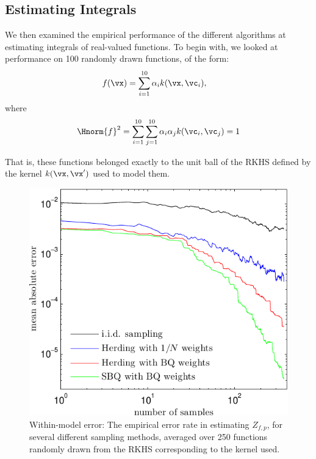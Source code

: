\subsection{Estimating Integrals}

We then examined the empirical performance of the different algorithms at estimating integrals of real-valued functions. To begin with, we looked at performance on 100 randomly drawn functions, of the form:
%
\begin{align}
f(\vx) & = \sum_{i=1}^{10} \alpha_i k(\vx, \vc_i),
\end{align}
%
where
%
\begin{align}
\Hnorm{f}^2 = \sum_{i=1}^{10} \sum_{j=1}^{10} \alpha_i \alpha_j k(\vc_i, \vc_j) = 1
\end{align}

That is, these functions belonged exactly to the unit ball of the RKHS defined by the kernel $k(\vx, \vx')$ used to model them.

\begin{figure}[t]
\centering
\includegraphics[width=.8\columnwidth]{figs/herding/error_curve_rkhs_400_v4}
\caption[Empirical error of Bayesian quadrature, herding and random sampling]{Within-model error: The empirical error rate in estimating $Z_{f,p}$, for several different sampling methods, averaged over 250 functions randomly drawn from the RKHS corresponding to the kernel used.}
\label{fig:error_curve}
\end{figure}

